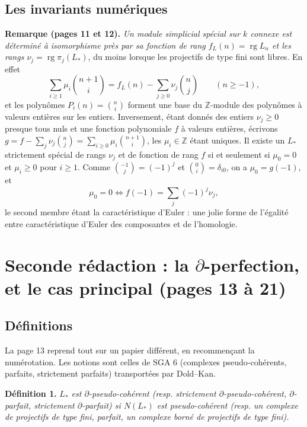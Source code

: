 \documentclass[11pt,a4paper]{article}
\begin{document}
\subsection*{Les invariants numériques}

\textbf{Remarque (pages 11 et 12).} \emph{Un module simplicial spécial sur
$k$ connexe est déterminé à isomorphisme près par sa fonction de rang
$f_{L}(n) = \operatorname{rg} L_{n}$ et les rangs $\nu_{j} =
\operatorname{rg} \pi_{j}(L_{*})$}, du moins lorsque les projectifs de type
fini sont libres. En effet
\[
  \sum_{i \geqslant 1} \mu_{i} \binom{n+1}{i} = f_{L}(n) - \sum_{j \geqslant 0}
  \nu_{j} \binom{n}{j} \qquad (n \geqslant -1),
\]
et les polynômes $P_{i}(n) = \binom{n}{i}$ forment une base du
$\mathbb{Z}$-module des polynômes à valeurs entières sur les entiers.
Inversement, étant donnés des entiers $\nu_{j} \geqslant 0$ presque tous nuls
et une fonction polynomiale $f$ à valeurs entières, écrivons
$g = f - \sum_{j} \nu_{j} \binom{n}{j} = \sum_{i \geqslant 0} \mu_{i}
\binom{n+1}{i}$, les $\mu_{i} \in \mathbb{Z}$ étant uniques. Il existe un
$L_{*}$ strictement spécial de rangs $\nu_{j}$ et de fonction de rang $f$ si
et seulement si $\mu_{0} = 0$ et $\mu_{i} \geqslant 0$ pour $i \geqslant 1$.
Comme $\binom{-1}{j} = (-1)^{j}$ et $\binom{0}{i} = \delta_{i0}$, on a
$\mu_{0} = g(-1)$, et
\[
  \mu_{0} = 0 \iff f(-1) = \sum_{j} (-1)^{j} \nu_{j} ,
\]
le second membre étant la caractéristique d'Euler : une jolie forme de
l'égalité entre caractéristique d'Euler des composantes et de l'homologie.

\section*{Seconde rédaction : la $\partial$-perfection, et le cas principal (pages 13 à 21)}

\subsection*{Définitions}

La page 13 reprend tout sur un papier différent, en recommençant la
numérotation. Les notions sont celles de SGA 6 (complexes pseudo-cohérents,
parfaits, strictement parfaits) transportées par Dold–Kan.

\textbf{Définition 1.} \emph{$L_{*}$ est $\partial$-pseudo-cohérent (resp.
strictement $\partial$-pseudo-cohérent, $\partial$-parfait, strictement
$\partial$-parfait) si $N(L_{*})$ est pseudo-cohérent (resp. un complexe de
projectifs de type fini, parfait, un complexe borné de projectifs de type
fini).}
\end{document}
